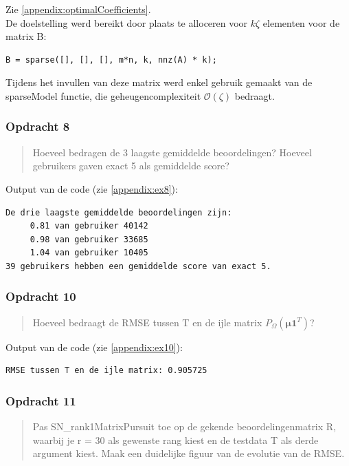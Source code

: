 \documentclass[11pt, a4paper, titlepage, openright]{article}
\begin{document}
    Zie \ref{appendix:optimalCoefficients}. \\
    De doelstelling werd bereikt door plaats te alloceren voor \(k\zeta\) elementen voor de matrix B:
\begin{lstlisting}[style=Matlab-editor, basicstyle = \scriptsize]
B = sparse([], [], [], m*n, k, nnz(A) * k);
\end{lstlisting}
    Tijdens het invullen van deze matrix werd enkel gebruik gemaakt van de sparseModel functie,
    die geheugencomplexiteit \(\mathcal{O}(\zeta)\) bedraagt.

	\subsubsection{Opdracht 8}
    \begin{quote}
        Hoeveel bedragen de 3 laagste gemiddelde beoordelingen? Hoeveel gebruikers gaven exact 5 als gemiddelde score?
    \end{quote}

	Output van de code (zie \ref{appendix:ex8}):
\begin{lstlisting}
De drie laagste gemiddelde beoordelingen zijn:
	 0.81 van gebruiker 40142
	 0.98 van gebruiker 33685
	 1.04 van gebruiker 10405
39 gebruikers hebben een gemiddelde score van exact 5.
\end{lstlisting}

	\subsubsection{Opdracht 10}
    \begin{quote}
        Hoeveel bedraagt de RMSE tussen T en de ijle matrix \( P_{\Omega}(\boldsymbol{\mu} \boldsymbol{1}^T ) \)?
    \end{quote}

	Output van de code (zie \ref{appendix:ex10}):
\begin{lstlisting}
RMSE tussen T en de ijle matrix: 0.905725
\end{lstlisting}

	\subsubsection{Opdracht 11}
    \begin{quote}
        Pas SN\_rank1MatrixPursuit toe op de gekende beoordelingenmatrix R, waarbij je r = 30 als gewenste rang kiest en de testdata T
        als derde argument kiest. Maak een duidelijke figuur van de evolutie van de RMSE.
    \end{quote}
\end{document}
